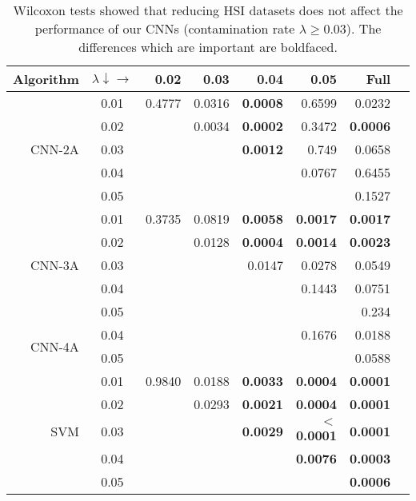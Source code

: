 \documentclass[journal]{IEEEtran}
\newcommand{\ContaminationRate}{\lambda}
\begin{document}
\begin{table}[ht!]
	\scriptsize
	\centering
	\caption{Wilcoxon tests showed that reducing HSI datasets does not affect the performance of our CNNs (contamination rate $\ContaminationRate\geq 0.03$). The differences which are important are boldfaced.}
	\label{tab:wilcoxon_stats}
	\renewcommand{\tabcolsep}{0.2cm}
	\begin{tabular}{rcrrrrrr}
		\Xhline{2\arrayrulewidth}
		Algorithm &    $\ContaminationRate\downarrow\rightarrow$     & 0.02 & 0.03 & 0.04 & 0.05 & Full \\
		\hline
		              & 0.01 & 0.4777 & 0.0316 & \textbf{0.0008} & 0.6599 &  0.0232 \\
	                  & 0.02 &  & 0.0034 & \textbf{0.0002} & 0.3472 & \textbf{0.0006}  \\
		      CNN-2A  & 0.03 &  &  & \textbf{0.0012} & 0.749 & 0.0658  \\
                      & 0.04 &  &  &  & 0.0767 &  0.6455 \\
                      & 0.05 &  &  &  &  & 0.1527  \\
                      \hline
                      & 0.01 & 0.3735 & 0.0819 & \textbf{0.0058} & \textbf{0.0017} & \textbf{0.0017}  \\
	                  & 0.02 &  & 0.0128 & \textbf{0.0004} & \textbf{0.0014} & \textbf{0.0023}  \\
		      CNN-3A  & 0.03 &  &  & 0.0147 & 0.0278 & 0.0549  \\
                      & 0.04 &  &  &  & 0.1443 & 0.0751  \\
                      & 0.05 &  &  &  &  & 0.234  \\
                      \hline
              \multirow{ 2}{*}{CNN-4A}  & 0.04 &  &  &  & 0.1676 &  0.0188 \\
                      & 0.05 &  &  &  &  & 0.0588  \\
                      \hline
                      & 0.01 & 0.9840 & 0.0188 & \textbf{0.0033} & \textbf{0.0004} & \textbf{0.0001}  \\
	                  & 0.02 &  & 0.0293 & \textbf{0.0021} & \textbf{0.0004} &  \textbf{0.0001} \\
		      SVM     & 0.03 &  &  & \textbf{0.0029} & \textbf{$<$0.0001} & \textbf{0.0001}  \\
                      & 0.04 &  &  &  & \textbf{0.0076} & \textbf{0.0003}  \\
                      & 0.05 &  &  &  &  & \textbf{0.0006}  \\

\end{tabular}
\end{table}
\end{document}
